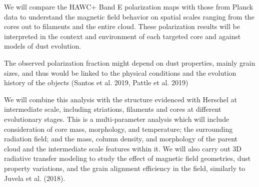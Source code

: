 \documentclass[11pt]{amsart}
\begin{document}
We will compare the HAWC+ Band E  polarization maps with those from Planck data
 to understand the magnetic field behavior on spatial scales ranging from the cores out to filaments and the
entire cloud. These polarization results will be interpreted in the context and environment of each 
targeted core and against models of dust evolution. 

The observed polarization fraction might depend on dust properties, mainly grain sizes, and thus would be linked to 
the physical conditions and the evolution history of the objects (Santos et al. 2019, Pattle et al. 2019)

%

We will combine this analysis with the structure evidenced with Herschel
at intermediate scale, including striations, filaments and cores at different evolutionary stages.
This is a multi-parameter analysis which will include consideration of core mass, morphology, and temperature;
the surrounding radiation field; and the mass, column density, and morphology of the parent cloud and the intermediate scale features within it.
We will also carry out 3D radiative transfer modeling to study the effect of magnetic field geometries, dust property variations, and the grain alignment efficiency in the field, similarly to Juvela et al. (2018).
 
\end{document}
